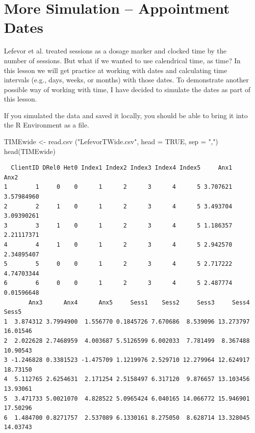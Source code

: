 \documentclass[
  english,
]{book}
\newenvironment{Shaded}{\begin{snugshade}}{\end{snugshade}}
\newcommand{\AttributeTok}[1]{\textcolor[rgb]{0.77,0.63,0.00}{#1}}
\newcommand{\ConstantTok}[1]{\textcolor[rgb]{0.00,0.00,0.00}{#1}}
\newcommand{\FunctionTok}[1]{\textcolor[rgb]{0.00,0.00,0.00}{#1}}
\newcommand{\NormalTok}[1]{#1}
\newcommand{\OtherTok}[1]{\textcolor[rgb]{0.56,0.35,0.01}{#1}}
\newcommand{\StringTok}[1]{\textcolor[rgb]{0.31,0.60,0.02}{#1}}
\begin{document}
\hypertarget{more-simulation-appointment-dates}{%
\section{More Simulation -- Appointment Dates}\label{more-simulation-appointment-dates}}

Lefevor et al. \citeyearpar{lefevor_religious_2017} treated sessions as a dosage marker and clocked time by the number of sessions. But what if we wanted to use calendrical time, as time? In this lesson we will get practice at working with dates and calculating time intervals (e.g., days, weeks, or months) with those dates. To demonstrate another possible way of working with time, I have decided to simulate the dates as part of this lesson.

If you simulated the data and saved it locally, you should be able to bring it into the R Environment as a file.

\begin{Shaded}
\begin{Highlighting}[]
\NormalTok{TIMEwide }\OtherTok{\textless{}{-}} \FunctionTok{read.csv}\NormalTok{ (}\StringTok{"LefevorTWide.csv"}\NormalTok{, }\AttributeTok{head =} \ConstantTok{TRUE}\NormalTok{, }\AttributeTok{sep =} \StringTok{","}\NormalTok{)}
\FunctionTok{head}\NormalTok{(TIMEwide)}
\end{Highlighting}
\end{Shaded}

\begin{verbatim}
  ClientID DRel0 Het0 Index1 Index2 Index3 Index4 Index5     Anx1       Anx2
1        1     0    0      1      2      3      4      5 3.707621 3.57984960
2        2     1    0      1      2      3      4      5 3.493704 3.09390261
3        3     1    0      1      2      3      4      5 1.186357 2.21117371
4        4     1    0      1      2      3      4      5 2.942570 2.34895407
5        5     0    0      1      2      3      4      5 2.717222 4.74703344
6        6     0    0      1      2      3      4      5 2.487774 0.01596648
       Anx3      Anx4      Anx5     Sess1    Sess2     Sess3     Sess4    Sess5
1  3.874312 3.7994900  1.556770 0.1845726 7.670686  8.539096 13.273797 16.01546
2  2.022628 2.7468959  4.003687 5.5126599 6.002033  7.781499  8.367488 10.90543
3 -1.246828 0.3381523 -1.475709 1.1219976 2.529710 12.279964 12.624917 18.73150
4  5.112765 2.6254631  2.171254 2.5158497 6.317120  9.876657 13.103456 13.93061
5  3.471733 5.0021070  4.828522 5.0965424 6.040165 14.066772 15.946901 17.50296
6  1.484700 0.8271757  2.537089 6.1330161 8.275050  8.628714 13.328045 14.03743
\end{verbatim}
\end{document}
